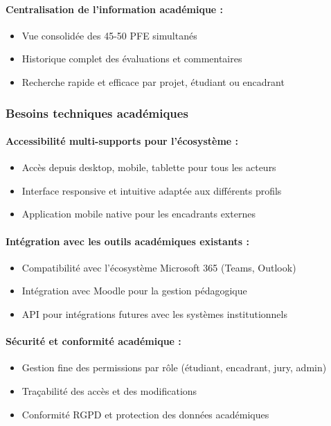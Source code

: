 \paragraph{Centralisation de l'information académique :}
\begin{itemize}
    \item Vue consolidée des 45-50 PFE simultanés
    \item Historique complet des évaluations et commentaires
    \item Recherche rapide et efficace par projet, étudiant ou encadrant
\end{itemize}

\subsubsection{Besoins techniques académiques}

\paragraph{Accessibilité multi-supports pour l'écosystème :}
\begin{itemize}
    \item Accès depuis desktop, mobile, tablette pour tous les acteurs
    \item Interface responsive et intuitive adaptée aux différents profils
    \item Application mobile native pour les encadrants externes
\end{itemize}

\paragraph{Intégration avec les outils académiques existants :}
\begin{itemize}
    \item Compatibilité avec l'écosystème Microsoft 365 (Teams, Outlook)
    \item Intégration avec Moodle pour la gestion pédagogique
    \item API pour intégrations futures avec les systèmes institutionnels
\end{itemize}

\paragraph{Sécurité et conformité académique :}
\begin{itemize}
    \item Gestion fine des permissions par rôle (étudiant, encadrant, jury, admin)
    \item Traçabilité des accès et des modifications
    \item Conformité RGPD et protection des données académiques
\end{itemize}

